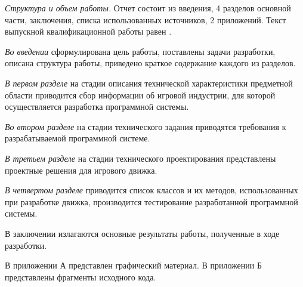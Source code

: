\emph{Структура и объем работы.} Отчет состоит из введения, 4 разделов основной части, заключения, списка использованных источников, 2 приложений. Текст выпускной квалификационной работы равен .

\emph{Во введении} сформулирована цель работы, поставлены задачи разработки, описана структура работы, приведено краткое содержание каждого из разделов.

\emph{В первом разделе} на стадии описания технической характеристики предметной области приводится сбор информации об игровой индустрии, для которой осуществляется разработка программной системы. 

\emph{Во втором разделе} на стадии технического задания приводятся требования к разрабатываемой программной системе.

\emph{В третьем разделе} на стадии технического проектирования представлены проектные решения для игрового движка.

\emph{В четвертом разделе} приводится список классов и их методов, использованных при разработке движка, производится тестирование разработанной программной системы.

В заключении излагаются основные результаты работы, полученные в ходе разработки.

В приложении А представлен графический материал.
В приложении Б представлены фрагменты исходного кода. 
